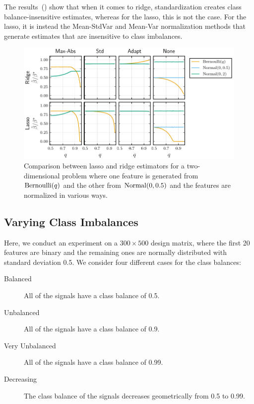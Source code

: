The results~() show that when it comes to ridge, standardization creates class balance-insensitive estimates, whereas for the lasso, this is not the case. For the lasso, it is instead the Mean-StdVar and Mean-Var normalization methods that generate estimates that are insensitive to class imbalances.

\begin{figure}[htpb]
  \centering
  \includegraphics{plots/lassoridge_twodim.pdf}
  \caption{%
    Comparison between lasso and ridge estimators for a two-dimensional problem where one feature is generated from \(\operatorname{Bernoulli}(q)\) and the other from \(\operatorname{Normal}(0, 0.5)\) and the features are normalized in various ways.}
  \label{fig:lasso-ridge-comparison}
\end{figure}

\subsection{Varying Class Imbalances}

Here, we conduct an experiment on a \(300 \times 500\) design matrix, where the first 20 features are binary and the remaining ones are normally distributed with standard deviation 0.5. We consider four different cases for the class balances:
\begin{description}
  \item[Balanced] All of the signals have a class balance of 0.5.
  \item[Unbalanced] All of the signals have a class balance of 0.9.
  \item[Very Unbalanced] All of the signals have a class balance of 0.99.
  \item[Decreasing] The class balance of the signals decreases geometrically from 0.5 to 0.99.
\end{description}

